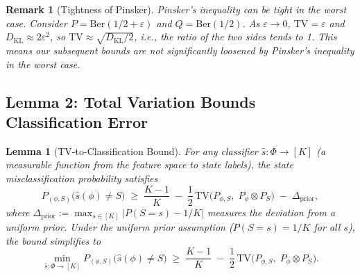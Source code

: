 \documentclass[12pt,a4paper]{article}
\newtheorem{lemma}[theorem]{Lemma}
\newtheorem{remark}[theorem]{Remark}
\newcommand{\KL}{D_{\mathrm{KL}}}
\newcommand{\TV}{\mathrm{TV}}
\newcommand{\Ber}{\mathrm{Ber}}
\begin{document}
\begin{remark}[Tightness of Pinsker]
\label{rem:pinsker-tight}
Pinsker's inequality can be tight in the worst case. Consider $P = \Ber(1/2 + \varepsilon)$ and
$Q = \Ber(1/2)$. As $\varepsilon \to 0$, $\TV = \varepsilon$ and
$\KL \approx 2\varepsilon^2$, so $\TV \approx \sqrt{\KL/2}$,
i.e., the ratio of the two sides tends to 1. This means our subsequent bounds are not significantly loosened by Pinsker's inequality in the worst case.
\end{remark}

\subsection{Lemma 2: Total Variation Bounds Classification Error}
\label{sec:lemma2}

\begin{lemma}[TV-to-Classification Bound]
\label{lem:tv-class}
For any classifier $\hat{s}: \Phi \to [K]$ (a measurable function from the
feature space to state labels), the state misclassification probability satisfies
\begin{equation}\label{eq:tv-class-bound}
    P_{(\phi,S)}\bigl(\hat{s}(\phi) \neq S\bigr)
    \;\geq\; \frac{K-1}{K} \;-\; \frac{1}{2}\,
            \TV\bigl(P_{\phi,S},\; P_\phi \otimes P_S\bigr)
    \;-\; \Delta_{\mathrm{prior}},
\end{equation}
where $\Delta_{\mathrm{prior}} := \max_{s\in[K]} |P(S=s) - 1/K|$ measures the
deviation from a uniform prior.  Under the uniform prior assumption
($P(S=s) = 1/K$ for all $s$), the bound simplifies to
\begin{equation}\label{eq:tv-class-uniform}
    \min_{\hat{s}: \Phi \to [K]}
    P_{(\phi,S)}\bigl(\hat{s}(\phi) \neq S\bigr)
    \;\geq\; \frac{K-1}{K} \;-\; \frac{1}{2}\,
            \TV\bigl(P_{\phi,S},\; P_\phi \otimes P_S\bigr).
\end{equation}
\end{lemma}
\end{document}
